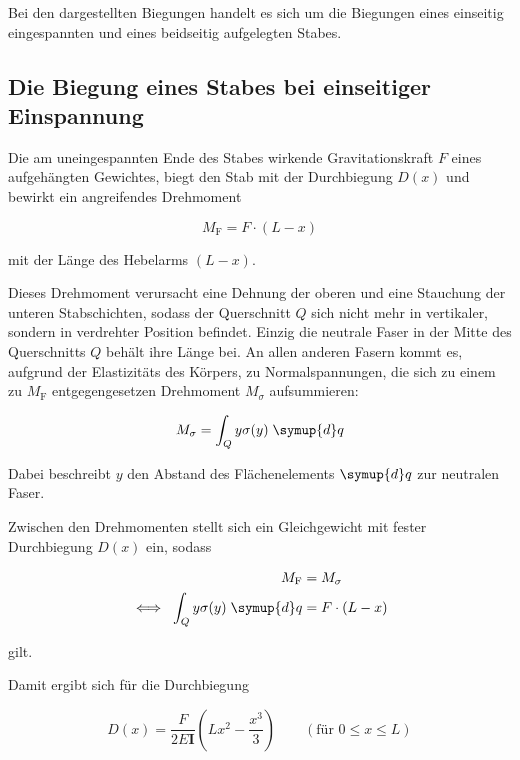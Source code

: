 Bei den dargestellten Biegungen handelt es sich um die Biegungen eines einseitig
eingespannten und eines beidseitig aufgelegten Stabes.

\subsection{Die Biegung eines Stabes bei einseitiger Einspannung}

Die am uneingespannten Ende des Stabes wirkende Gravitationskraft $F$ eines 
aufgehängten Gewichtes, biegt den Stab mit der Durchbiegung $D(x)$ und
bewirkt ein angreifendes Drehmoment

\begin{equation*}
    M_\text{F} = F \cdot (L - x)
\end{equation*}

mit der Länge des Hebelarms $(L - x)$.

Dieses Drehmoment verursacht eine Dehnung der oberen und eine Stauchung
der unteren Stabschichten, sodass der Querschnitt $Q$ sich nicht mehr in vertikaler,
sondern in verdrehter Position befindet. Einzig die neutrale Faser in der Mitte
des Querschnitts $Q$ behält ihre Länge bei. An allen anderen Fasern kommt es,
aufgrund der Elastizitäts des Körpers, zu Normalspannungen, die sich zu einem
zu $M_\text{F}$ entgegengesetzen Drehmoment $M_\sigma$ aufsummieren:

\begin{equation*}
    M_\sigma = \int_Q y \sigma(y) \; \symup{d}q
\end{equation*}

Dabei beschreibt $y$ den Abstand des Flächenelements $\symup{d}q$ zur neutralen Faser.

Zwischen den Drehmomenten stellt sich ein Gleichgewicht mit fester
Durchbiegung $D(x)$ ein, sodass 

\begin{align*}
    M_\text{F} &= M_\sigma \\
    \iff \; \int_Q y \sigma(y) \; \symup{d}q &= F \cdot (L - x)
\end{align*}

gilt.

Damit ergibt sich für die Durchbiegung

\begin{equation}
    D(x) = \frac{F}{2 E \symbf{I}} \left(L x^2 - \frac{x^3}{3} \right) 
    \qquad (\text{für } 0 \leq x \leq L)
    \label{eqn:Biegung}
\end{equation}

